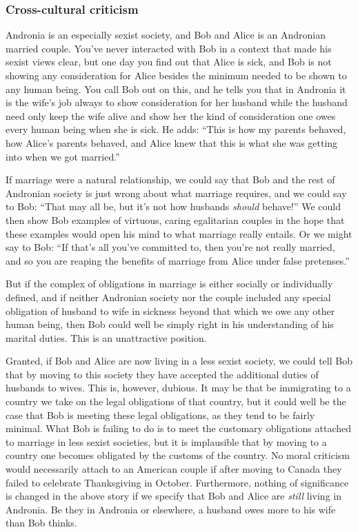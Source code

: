 \subsubsection{Cross-cultural criticism}
Andronia is an especially sexist society, and Bob and Alice is an Andronian married couple. You've never interacted with Bob in a context that made his sexist
views clear, but one day you find out that Alice is sick, and Bob is not showing any consideration for Alice besides the minimum needed to be shown to any human being. You
call Bob out on this, and he tells you that in Andronia it is the wife's job always to show consideration for her husband while the husband need only keep the wife alive
and show her the kind of consideration one owes every human being when she is sick. He adds: ``This is how my parents behaved, how Alice's parents behaved, and Alice knew that this is what she was getting into when we got married.''

If marriage were a natural relationship, we could say that Bob and the rest of Andronian society is just wrong about what marriage requires, and we could
say to Bob: ``That may all be, but it's not how husbands \textit{should} behave!'' We could then show Bob examples of virtuous, caring egalitarian couples
in the hope that these examples would open his mind to what marriage really entails. Or we might say to Bob: ``If that's all you've committed to, then
you're not really married, and so you are reaping the benefits of marriage from Alice under false pretenses.''

But if the complex of obligations in marriage is either socially or individually defined, and if neither Andronian society nor the couple included
any special obligation of husband to wife in sickness beyond that which we owe any other human being, then Bob could well be simply right in his understanding
of his marital duties. This is an unattractive position.

Granted, if Bob and Alice are now living in a less sexist society, we could tell Bob that by moving to this society they have accepted the additional
duties of husbands to wives. This is, however, dubious. It may be that be immigrating to a country we take on the legal obligations of that
country, but it could well be the case that Bob is meeting these legal obligations, as they tend to be fairly minimal. What Bob is failing to do is
to meet the customary obligations attached to marriage in less sexist societies, but it is implausible that by moving to a country one becomes obligated
by the customs of the country. No moral criticism would necessarily attach to an American couple if after moving to Canada they failed to celebrate
Thanksgiving in October. Furthermore, nothing of significance is changed in the above story if we specify that Bob and Alice are \textit{still} living in
Andronia. Be they in Andronia or elsewhere, a husband owes more to his wife than Bob thinks.

